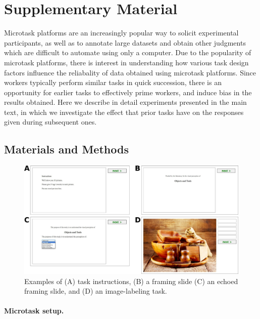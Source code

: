 \documentclass{sigchi}
\begin{document}



\pagebreak
\section*{Supplementary Material}

Microtask platforms are an increasingly popular way to solicit experimental
participants, as well as to annotate large datasets and obtain other 
judgments which are difficult to automate using only a computer.  
Due to the popularity of microtask platforms, there is interest in 
understanding how various task design factors
influence the reliabality of data obtained using microtask platforms.  
Since workers typically perform similar tasks in quick succession, there is
an opportunity for earlier tasks to effectively prime workers, and induce 
bias in the results obtained.
Here we describe in detail experiments presented in the main text, in which
we investigate the effect that prior tasks have on the responses given during
subsequent ones.  

\subsection*{Materials and Methods}

\begin{figure}
	\includegraphics[scale=0.8]{figs/tasks.jpg}
	\caption{Examples of (A) task instructions, (B) a framing slide
		(C) an echoed framing slide, and (D) an image-labeling 
		task.
	}
	\label{fig:hit_preamble}
\end{figure}
\paragraph{Microtask setup.}
\end{document}

